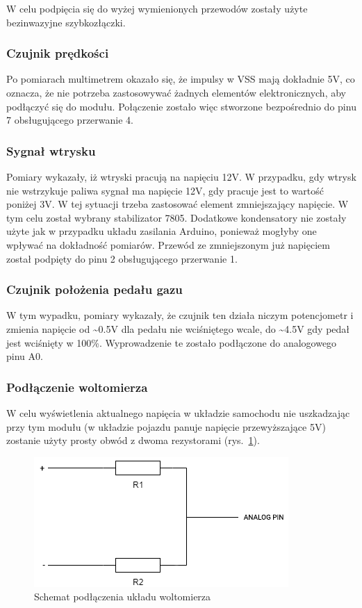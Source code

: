 W celu podpięcia się do wyżej wymienionych przewodów zostały użyte bezinwazyjne szybkozłączki. 

\subsubsection{Czujnik prędkości} \label{vss}
Po pomiarach multimetrem okazało się, że impulsy w VSS mają dokładnie 5V, co oznacza, że nie potrzeba zastosowywać żadnych elementów elektronicznych, aby podłączyć się do modułu. Połączenie zostało więc stworzone bezpośrednio do pinu 7 obsługującego przerwanie 4.

\subsubsection{Sygnał wtrysku} \label{inj}
Pomiary wykazały, iż wtryski pracują na napięciu 12V. W przypadku, gdy wtrysk nie wstrzykuje paliwa sygnał ma napięcie 12V, gdy pracuje jest to wartość poniżej 3V. W tej sytuacji trzeba zastosować element zmniejszający napięcie. W tym celu został wybrany stabilizator 7805. Dodatkowe kondensatory nie zostały użyte jak w przypadku układu zasilania Arduino, ponieważ mogłyby one wpływać na dokładność pomiarów. Przewód ze zmniejszonym już napięciem został podpięty do pinu 2 obsługującego przerwanie 1.

\subsubsection{Czujnik położenia pedału gazu}
W tym wypadku, pomiary wykazały, że czujnik ten działa niczym potencjometr i zmienia napięcie od \textasciitilde0.5V dla pedału nie wciśniętego wcale, do \textasciitilde4.5V gdy pedał jest wciśnięty w 100\%. Wyprowadzenie te zostało podłączone do analogowego pinu A0.

\subsubsection{Podłączenie woltomierza} \label{voltometer}

W celu wyświetlenia aktualnego napięcia w układzie samochodu nie uszkadzając przy tym modułu (w układzie pojazdu panuje napięcie przewyższające 5V) zostanie użyty prosty obwód z dwoma rezystorami (rys.~\ref{fig:voltometer}). 

\begin{figure}[!htb]
\centering
\includegraphics[width=0.7\linewidth]{Rysunki/voltometer_schemat.png}
\caption{Schemat podłączenia układu woltomierza}
\label{fig:voltometer}
\end{figure}

